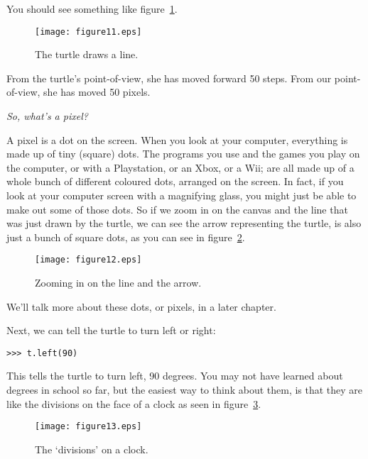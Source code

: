 You should see something like figure~\ref{fig11}.

\begin{figure}
\begin{center}
\texttt{[image: figure11.eps]}
\end{center}
\caption{The turtle draws a line.}\label{fig11}
\end{figure}

From the turtle's point-of-view, she has moved forward 50 steps.  From our point-of-view, she has moved 50 pixels.

\noindent
\emph{So, what's a pixel?}

A pixel is a dot on the screen.  When you look at your computer, everything is made up of tiny (square) dots.  The programs you use and the games you play on the computer, or with a Playstation, or an Xbox, or a Wii; are all made up of a whole bunch of different coloured dots, arranged on the screen.  In fact, if you look at your computer screen with a magnifying glass, you might just be able to make out some of those dots. So if we zoom in on the canvas and the line that was just drawn by the turtle, we can see the arrow representing the turtle, is also just a bunch of square dots, as you can see in figure~\ref{fig12}.

\begin{figure}
\begin{center}
\texttt{[image: figure12.eps]}
\end{center}
\caption{Zooming in on the line and the arrow.}\label{fig12}
\end{figure}

We'll talk more about these dots, or pixels, in a later chapter.

Next, we can tell the turtle to turn left or right:

\begin{listing}
\begin{verbatim}
>>> t.left(90)
\end{verbatim}
\end{listing}

This tells the turtle to turn left, 90 degrees.  You may not have learned about degrees in school so far, but the easiest way to think about them, is that they are like the divisions on the face of a clock as seen in figure~\ref{fig13}.

\begin{figure}
\begin{center}
\texttt{[image: figure13.eps]}
\end{center}
\caption{The `divisions' on a clock.}\label{fig13}
\end{figure}

